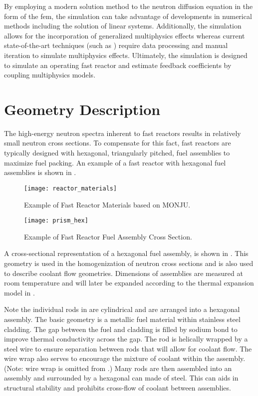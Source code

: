   By employing a modern solution method to the neutron diffusion equation in the
  form of the \gls{fem}, the simulation can take advantage of developments in
  numerical methods including the solution of linear systems. Additionally, the
  simulation allows for the incorporation of generalized multiphysics effects
  whereas current state-of-the-art techniques (such as \dif) require data
  processing and manual iteration to simulate multiphysics effects. Ultimately, 
  the simulation is designed to simulate an operating fast reactor and estimate
  feedback coefficients by coupling multiphysics models.

\section{Geometry Description}
  \label{sec:geometry_description}
  The high-energy neutron spectra inherent to fast reactors results in
  relatively small neutron cross sections. To compensate for this fact, fast
  reactors are typically designed with hexagonal, triangularly pitched, fuel
  assemblies to maximize fuel packing. An example of a fast reactor with
  hexagonal fuel assemblies is shown in .
  
  \begin{figure}
    \centering
    \texttt{[image: reactor\_materials]}
    \caption{Example of Fast Reactor Materials based on MONJU.}
    \label{fig:reactor_materials}
  \end{figure}

  \begin{figure}
    \centering
    \texttt{[image: prism\_hex]}
    \caption{Example of Fast Reactor Fuel Assembly Cross Section.}
    \label{fig:prism_hex}
  \end{figure}

  A cross-sectional representation of a hexagonal fuel assembly, is shown in
  . This geometry is used in the homogenization of neutron
  cross sections and is also used to describe coolant flow geometries.
  Dimensions of assemblies are measured at room temperature and will later be
  expanded according to the thermal expansion model in
  .

  Note the individual rods in  are cylindrical and are
  arranged into a hexagonal assembly. The basic geometry is a metallic fuel
  material within stainless steel cladding. The gap between the fuel and
  cladding is filled by sodium bond to improve thermal conductivity across the
  gap. The rod is helically wrapped by a steel wire to ensure separation between
  rods that will allow for coolant flow. The wire wrap also serves to encourage
  the mixture of coolant within the assembly. (Note: wire wrap is omitted from
  .) Many rods are then assembled into an assembly and
  surrounded by a hexagonal can made of steel. This can aids in structural
  stability and prohibits cross-flow of coolant between assemblies. 

